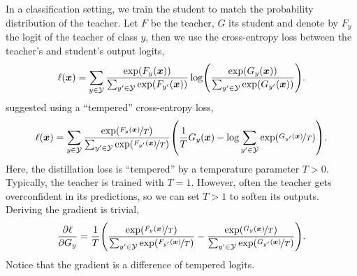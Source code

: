 In a classification setting, we train the student to match the probability distribution of the
teacher. Let $F$ be the teacher, $G$ its student and denote by $F_y$ the logit of the teacher of
class $y$, then we use the cross-entropy loss between the teacher's and student's output logits, \[
    \ell(\vec{x}) = \sum_{y\in \mathcal{Y}} \frac{\exp(F_y(\vec{x}))}{\sum_{y'\in \mathcal{Y}} \exp(F_{y'}(\vec{x}))} \log \lft( \frac{\exp(G_{y}(\vec{x}))}{\sum_{y' \in \mathcal{Y}} \exp(G_{y'}(\vec{x}))} \rgt).
\]
\citet{hinton2015distilling} suggested using a ``tempered'' cross-entropy loss, \[
    \ell(\vec{x}) = \sum_{y\in \mathcal{Y}} \frac{\exp(\nicefrac{F_y(\vec{x})}{T})}{\sum_{y'\in \mathcal{Y}} \exp(\nicefrac{F_{y'}(\vec{x})}{T})} \lft( \frac{1}{T} G_y(\vec{x}) - \log \sum_{y' \in \mathcal{Y}} \exp(\nicefrac{G_{y'}(\vec{x})}{T}) \rgt).
\]
Here, the distillation loss is ``tempered'' by a temperature parameter $T > 0$. Typically, the
teacher is trained with $T = 1$. However, often the teacher gets overconfident in its predictions,
so we can set $T > 1$ to soften its outputs. Deriving the gradient is trivial, \[
    \pdv{\ell}{G_y} = \frac{1}{T} \lft( \frac{\exp(\nicefrac{F_y(\vec{x})}{T})}{\sum_{y' \in \mathcal{Y}} \exp(\nicefrac{F_{y'}(\vec{x})}{T})} - \frac{\exp(\nicefrac{G_y(\vec{x})}{T})}{\sum_{y' \in \mathcal{Y}} \exp(\nicefrac{G_{y'}(\vec{x})}{T})} \rgt).
\]
Notice that the gradient is a difference of tempered logits.
